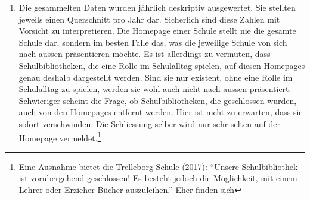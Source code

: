 \documentclass[a4paper,
fontsize=11pt,
oneside,
numbers=noperiodatend,
parskip=half-,
bibliography=totoc,
final
]{scrartcl}
\begin{document}
\begin{enumerate}
{    von Lesewettbewerben fanden, die keine Schulbibliothek abbildeten.}
  Dabei wurden relativ liberale Kriterien angelegt. Wenn eine
  Schulbibliothek genannt wurde, wurde sie als existent angenommen.
  Ausgeschlossen wurden nur Einrichtungen, die erkennbar reine
  Sammlungen von Klassensätzen darstellten (da diese keine Funktion als
  Bibliothek für die Schülerinnen und Schüler bieten), oder aber, wenn
  die letzte Meldung zu einer Schulbibliothek drei oder mehr Jahre
  zurücklag.\footnote{Erstaunlich oft wurde in Sitzungsprotokollen von
    Gesamtelternvertretungen oder Fördervereinen von Schulen eine
    Bibliotheken als Projekt erwähnt, die dann aber in den Folgejahren
    nicht als existent nachzuweisen war.} Die Studie nutzt also die
  Eigendefinition der Schulen -- wenn diese eine Einrichtung als
  Schulbibliothek beschrieben, dann wurde sie als solche
  gezählt.\footnote{In der Magisterarbeit (Schuldt 2006) wurden noch
    genauere Kriterien angelegt, deren Erhebung sich allerdings als kaum
    durchführbar erwies.} Die Plausibilität der Angaben wurde, so weit
  möglich, überprüft -- zum Beispiel ob es wirklich die aktuelle
  Homepage der genannten Schule (und nicht eine \enquote{aufgegebene}
  Homepage oder aber eine gleich benannten Schule in einem anderen
  Bundesland) war. Anschliessend wurde der Nachweis in einer Liste
  verzeichnet und, wenn möglich, die jeweilige Fundstelle als Snapshot
  abgespeichert.
\item
  Die gesammelten Daten wurden jährlich deskriptiv ausgewertet. Sie
  stellten jeweils einen Querschnitt pro Jahr dar. Sicherlich sind diese
  Zahlen mit Vorsicht zu interpretieren. Die Homepage einer Schule
  stellt nie die gesamte Schule dar, sondern im besten Falle das, was
  die jeweilige Schule von sich nach aussen präsentieren möchte. Es ist
  allerdings zu vermuten, dass Schulbibliotheken, die eine Rolle im
  Schulalltag spielen, auf diesen Homepages genau deshalb dargestellt
  werden. Sind sie nur existent, ohne eine Rolle im Schulalltag zu
  spielen, werden sie wohl auch nicht nach aussen präsentiert.
  Schwieriger scheint die Frage, ob Schulbibliotheken, die geschlossen
  wurden, auch von den Homepages entfernt werden. Hier ist nicht zu
  erwarten, dass sie sofort verschwinden. Die Schliessung selber wird
  nur sehr selten auf der Homepage vermeldet.\footnote{Eine Ausnahme
    bietet die Trelleborg Schule (2017): \enquote{Unsere Schulbibliothek
    ist vorübergehend geschlossen! Es besteht jedoch die Möglichkeit,
    mit einem Lehrer oder Erzieher Bücher auszuleihen.} Eher finden sich
}
\end{enumerate}
\end{document}

